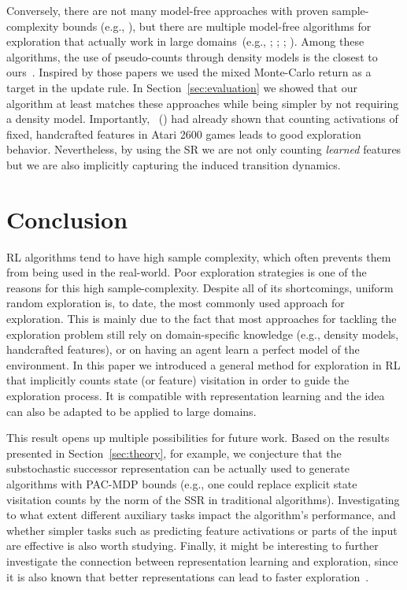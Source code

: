 \documentclass[letterpaper]{article} \usepackage{aaai20}  \usepackage{times}  \usepackage{helvet} \usepackage{courier}  \usepackage[hyphens]{url}  \usepackage{graphicx} \urlstyle{rm} \def\UrlFont{\rm}  \usepackage{graphicx}  \frenchspacing  \setlength{\pdfpagewidth}{8.5in}  \setlength{\pdfpageheight}{11in}  \usepackage{booktabs}
\begin{document}
Conversely, there are not many model-free approaches with proven sample-complexity bounds (e.g., \citeauthor{Strehl06} \citeyear{Strehl06}), but there are multiple model-free algorithms for exploration that actually work in large domains~(e.g., \citeauthor{Bellemare16} \citeyear{Bellemare16}; \citeauthor{Ostrovski17} \citeyear{Ostrovski17}; \citeauthor{Plappert18} \citeyear{Plappert18}; \citeauthor{Burda19} \citeyear{Burda19}). Among these algorithms, the use of pseudo-counts through density models is the closest to ours~\cite{Bellemare16,Ostrovski17}. Inspired by those papers we used the mixed Monte-Carlo return as a target in the update rule. In Section~\ref{sec:evaluation} we showed that our algorithm at least matches these approaches while being simpler by not requiring a density model. Importantly, \citeauthor{Martin17}~(\citeyear{Martin17}) had already shown that counting activations of fixed, handcrafted features in Atari 2600 games leads to good exploration behavior. Nevertheless, by using the SR we are not only counting \emph{learned} features but we are also implicitly capturing the induced transition dynamics.

\section{Conclusion}

RL algorithms tend to have high sample complexity, which often prevents them from being used in the real-world. Poor exploration strategies is one of the reasons for this high sample-complexity. Despite all of its shortcomings, uniform random exploration is, to date, the most commonly used approach for exploration. This is mainly due to the fact that most approaches for tackling the exploration problem still rely on domain-specific knowledge (e.g., density models, handcrafted features), or on having an agent learn a perfect model of the environment. In this paper we introduced a general method for exploration in RL that implicitly counts state (or feature) visitation in order to guide the exploration process. It is compatible with representation learning and the idea can also be adapted to be applied to large domains.

This result opens up multiple possibilities for future work. Based on the results presented in Section~\ref{sec:theory}, for example, we conjecture that the substochastic successor representation can be actually used to generate algorithms with PAC-MDP bounds (e.g., one could replace explicit state visitation counts by the norm of the SSR in traditional algorithms). Investigating to what extent different auxiliary tasks impact the algorithm's performance, and whether simpler tasks such as predicting feature activations or parts of the input~\cite{Jaderberg17} are effective is also worth studying. Finally, it might be interesting to further investigate the connection between representation learning and exploration, since it is also known that better representations can lead to faster exploration~\cite{Jiang17}.
\end{document}
